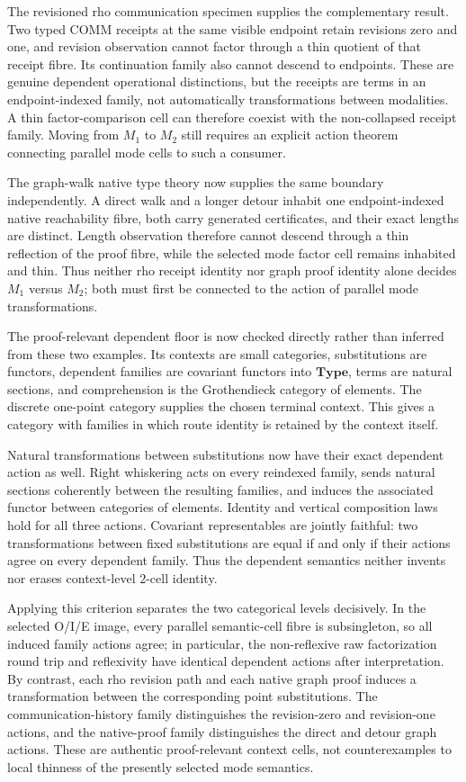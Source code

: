 \documentclass[11pt]{article}
\theoremstyle{definition}
\theoremstyle{remark}
\begin{document}
The revisioned rho communication specimen supplies the complementary result.
Two typed COMM receipts at the same visible endpoint retain revisions zero and
one, and revision observation cannot factor through a thin quotient of that
receipt fibre.  Its continuation family also cannot descend to endpoints.
These are genuine dependent operational distinctions, but the receipts are
terms in an endpoint-indexed family, not automatically transformations between
modalities.  A thin factor-comparison cell can therefore coexist with the
non-collapsed receipt family.  Moving from $M_1$ to $M_2$ still requires an
explicit action theorem connecting parallel mode cells to such a consumer.

The graph-walk native type theory now supplies the same boundary independently.
A direct walk and a longer detour inhabit one endpoint-indexed native
reachability fibre, both carry generated certificates, and their exact lengths
are distinct.  Length observation therefore cannot descend through a thin
reflection of the proof fibre, while the selected mode factor cell remains
inhabited and thin.  Thus neither rho receipt identity nor graph proof identity
alone decides $M_1$ versus $M_2$; both must first be connected to the action of
parallel mode transformations.

The proof-relevant dependent floor is now checked directly rather than inferred
from these two examples.  Its contexts are small categories, substitutions are
functors, dependent families are covariant functors into $\mathbf{Type}$, terms
are natural sections, and comprehension is the Grothendieck category of
elements.  The discrete one-point category supplies the chosen terminal
context.  This gives a category with families in which route identity is
retained by the context itself.

Natural transformations between substitutions now have their exact dependent
action as well.  Right whiskering acts on every reindexed family, sends natural
sections coherently between the resulting families, and induces the associated
functor between categories of elements.  Identity and vertical composition
laws hold for all three actions.  Covariant representables are jointly
faithful: two transformations between fixed substitutions are equal if and
only if their actions agree on every dependent family.  Thus the dependent
semantics neither invents nor erases context-level $2$-cell identity.

Applying this criterion separates the two categorical levels decisively.  In
the selected O/I/E image, every parallel semantic-cell fibre is subsingleton,
so all induced family actions agree; in particular, the non-reflexive raw
factorization round trip and reflexivity have identical dependent actions after
interpretation.  By contrast, each rho revision path and each native graph
proof induces a transformation between the corresponding point substitutions.
The communication-history family distinguishes the revision-zero and
revision-one actions, and the native-proof family distinguishes the direct and
detour graph actions.  These are authentic proof-relevant context cells, not
counterexamples to local thinness of the presently selected mode semantics.
\end{document}
